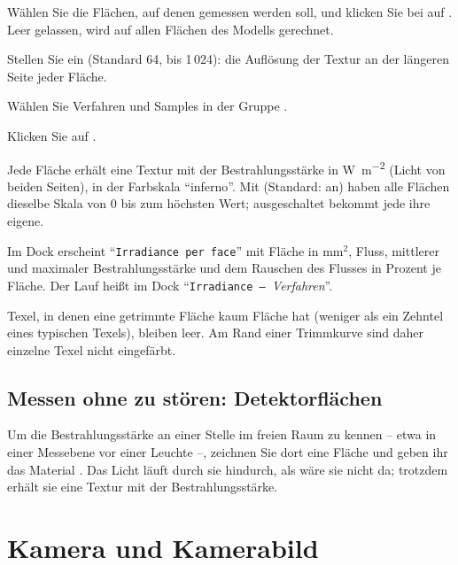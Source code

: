 \begin{schritte}
  \item Wählen Sie die Flächen, auf denen gemessen werden soll, und klicken Sie bei
     auf . Leer gelassen, wird auf allen Flächen des Modells
    gerechnet.
  \item Stellen Sie  ein (Standard 64, bis 1\,024): die Auflösung der
    Textur an der längeren Seite jeder Fläche.
  \item Wählen Sie Verfahren und Samples in der Gruppe .
  \item Klicken Sie auf .
\end{schritte}

Jede Fläche erhält eine Textur mit der Bestrahlungsstärke in \si{\watt\per\square\metre} (Licht
von beiden Seiten), in der Farbskala \enquote{inferno}. Mit 
(Standard: an) haben alle Flächen dieselbe Skala von 0 bis zum höchsten Wert; ausgeschaltet
bekommt jede ihre eigene.

Im Dock  erscheint \enquote{\texttt{Irradiance per face}} mit Fläche in mm$^2$,
Fluss, mittlerer und maximaler Bestrahlungsstärke und dem Rauschen des Flusses in Prozent je
Fläche. Der Lauf heißt im Dock  \enquote{\texttt{Irradiance – }\textit{Verfahren}}.

\begin{hinweis}
Texel, in denen eine getrimmte Fläche kaum Fläche hat (weniger als ein Zehntel eines typischen
Texels), bleiben leer. Am Rand einer Trimmkurve sind daher einzelne Texel nicht eingefärbt.
\end{hinweis}

\subsection{Messen ohne zu stören: Detektorflächen}

Um die Bestrahlungsstärke an einer Stelle im freien Raum zu kennen -- etwa in einer Messebene vor
einer Leuchte --, zeichnen Sie dort eine Fläche und geben ihr das Material . Das
Licht läuft durch sie hindurch, als wäre sie nicht da; trotzdem erhält sie eine Textur mit der
Bestrahlungsstärke.

\section{Kamera und Kamerabild}\label{sec:pt-kamera}

